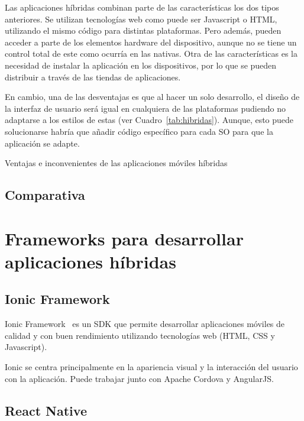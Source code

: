 Las aplicaciones híbridas combinan parte de las características los dos tipos anteriores. Se utilizan tecnologías web 
como puede ser Javascript o HTML, utilizando el mismo código para distintas plataformas. Pero además, pueden 
acceder a parte de los elementos hardware del dispositivo, aunque no se tiene un control total de este como 
ocurría en las nativas. Otra de las características es la necesidad de instalar la aplicación en los dispositivos, por 
lo que se pueden distribuir a través de las tiendas de aplicaciones.

En cambio, una de las desventajas es que al hacer un solo desarrollo, el diseño de la interfaz de usuario será igual
en cualquiera de las plataformas pudiendo no adaptarse a los estilos de estas (ver Cuadro~\ref{tab:hibridas}). Aunque, esto puede solucionarse
habría que añadir código específico para cada \acs{SO} para que la aplicación se adapte.

\begin{table}[hibridas]
	\centering
	{\small
		
	}
	\caption[Ventajas e inconvenientes de las aplicaciones móviles híbridas]
	{Ventajas e inconvenientes de las aplicaciones móviles híbridas~\cite{TIPAPP}}
	\label{tab:hibridas}
\end{table}

\subsection{Comparativa}

\section{Frameworks para desarrollar aplicaciones híbridas}

\subsection{Ionic Framework}

Ionic Framework~\cite{IONIC} es un SDK que permite desarrollar aplicaciones móviles de calidad y con buen 
rendimiento utilizando tecnologías web (HTML, CSS y Javascript).

Ionic se centra principalmente en la apariencia visual y la interacción del usuario con la aplicación. Puede 
trabajar junto con Apache Cordova y AngularJS. 



\subsection{React Native}
